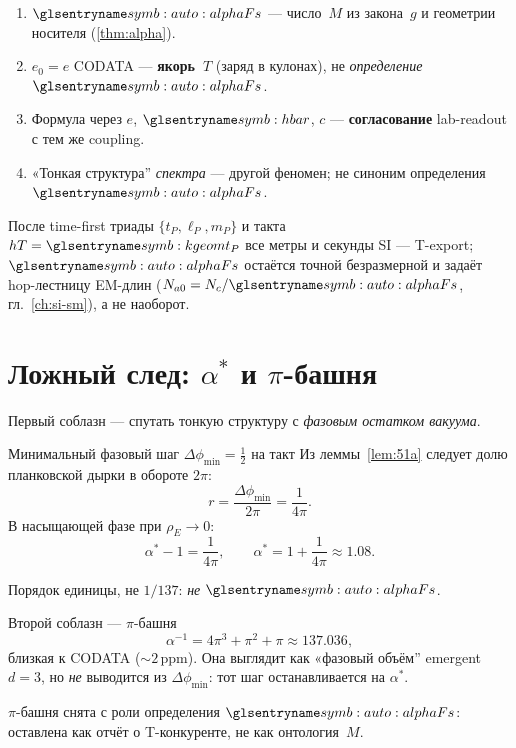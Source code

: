 \begin{remark}
\label{rem:alpha-name-order}
\begin{enumerate}[label=\arabic*.]
\item $\alphaFs$ --- число~$M$ из закона~$g$ и геометрии носителя (\cref{thm:alpha}).
\item $e_0=e$ CODATA --- \textbf{якорь~$T$} (заряд в кулонах), не \emph{определение} $\alphaFs$.
\item Формула через $e$, $\planckHbar$, $c$ --- \textbf{согласование} lab-readout с тем же coupling.
\item «Тонкая структура'' \emph{спектра} --- другой феномен; не синоним определения $\alphaFs$.
\end{enumerate}
После time-first триады $\{t_P,\ell_P,m_P\}$ и такта $\htick=\caKappaGeom t_P$
все метры и секунды SI --- T-export; $\alphaFs$ остаётся точной безразмерной
и задаёт hop-лестницу EM-длин ($N_{a0}=N_c/\alphaFs$, гл.~\ref{ch:si-sm}),
а не наоборот.
\end{remark}

\section{Ложный след: $\alpha^*$ и $\pi$-башня}

Первый соблазн --- спутать тонкую структуру с \emph{фазовым остатком вакуума}.

\begin{lemma}
\label{lem:vacuum-phase-residue}
Минимальный фазовый шаг $\Delta\phi_{\min}=\tfrac12$ на такт
Из леммы~\ref{lem:51a} следует долю планковской дырки в обороте $2\pi$:
\[
  r=\frac{\Delta\phi_{\min}}{2\pi}=\frac{1}{4\pi}.
\]
В насыщающей фазе при $\rho_E\to 0$:
\[
  \alpha^*-1=\frac{1}{4\pi},\qquad \alpha^*=1+\frac{1}{4\pi}\approx 1.08.
\]
\end{lemma}

Порядок единицы, не $1/137$: \emph{не} $\alphaFs$.

Второй соблазн --- $\pi$-башня
\[
  \alpha^{-1}=4\pi^3+\pi^2+\pi\approx 137.036,
\]
близкая к CODATA ($\sim 2$\,ppm).
Она выглядит как «фазовый объём'' emergent $d=3$,
но \emph{не} выводится из $\Delta\phi_{\min}$:
тот шаг останавливается на $\alpha^*$.

\begin{remark}
\label{rem:pi-tower}
$\pi$-башня снята с роли определения $\alphaFs$:
оставлена как отчёт о T-конкуренте, не как онтология~$M$.
\end{remark}

